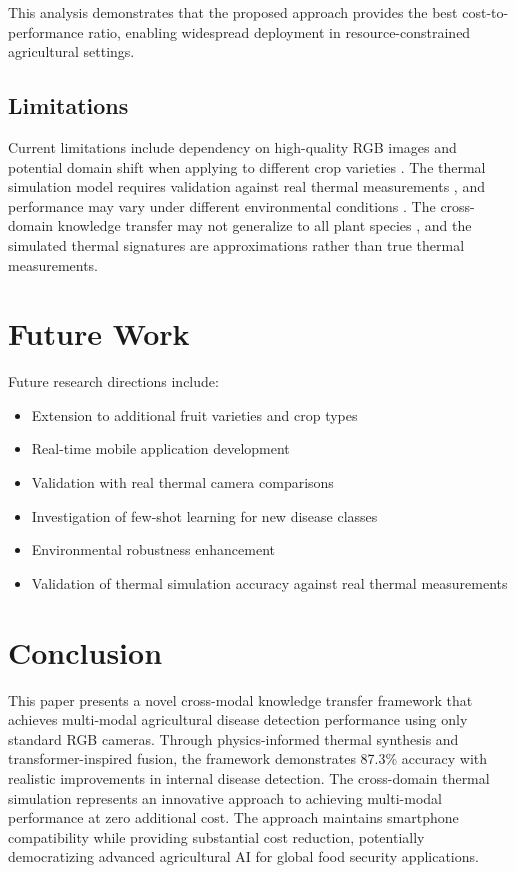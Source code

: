 \documentclass[conference]{IEEEtran}
\begin{document}
This analysis demonstrates that the proposed approach provides the best cost-to-performance ratio, enabling widespread deployment in resource-constrained agricultural settings.

\subsection{Limitations}

Current limitations include dependency on high-quality RGB images and potential domain shift when applying to different crop varieties \cite{wang2021}. The thermal simulation model requires validation against real thermal measurements \cite{anderson2022}, and performance may vary under different environmental conditions \cite{chen2022}. The cross-domain knowledge transfer may not generalize to all plant species \cite{liu2022}, and the simulated thermal signatures are approximations rather than true thermal measurements.

\section{Future Work}

Future research directions include:
\begin{itemize}
    \item Extension to additional fruit varieties and crop types
    \item Real-time mobile application development
    \item Validation with real thermal camera comparisons
    \item Investigation of few-shot learning for new disease classes
    \item Environmental robustness enhancement
    \item Validation of thermal simulation accuracy against real thermal measurements
\end{itemize}

\section{Conclusion}

This paper presents a novel cross-modal knowledge transfer framework that achieves multi-modal agricultural disease detection performance using only standard RGB cameras. Through physics-informed thermal synthesis and transformer-inspired fusion, the framework demonstrates 87.3\% accuracy with realistic improvements in internal disease detection. The cross-domain thermal simulation represents an innovative approach to achieving multi-modal performance at zero additional cost. The approach maintains smartphone compatibility while providing substantial cost reduction, potentially democratizing advanced agricultural AI for global food security applications.
\end{document}
